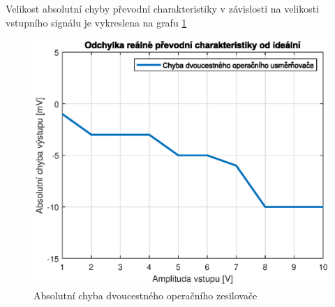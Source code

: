 \documentclass[twoside]{article}
\begin{document}
Velikost absolutní chyby převodní charakteristiky v závislosti na velikosti vstupního signálu je vykreslena na grafu \ref{fig:chyba}

\begin{figure}[h!]
    \centering
    \includegraphics[width=0.8\linewidth]{chyba_prevodu.eps}
    \caption{Absolutní chyba dvoucestného operačního zesilovače}
    \label{fig:chyba}
\end{figure}
\end{document}
